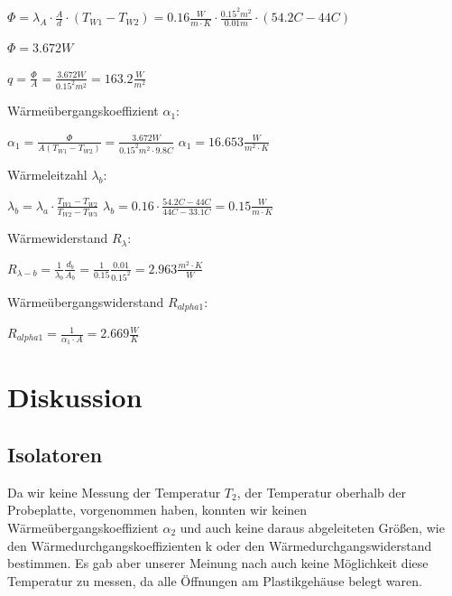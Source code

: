 \documentclass[12pt,a4paper,twopage]{article}
\begin{document}
\( \Phi = \lambda_A \cdot \frac{A}{d} \cdot (T_{W1}-T_{W2}) = 0.16 \frac{W}{m\cdot K} \cdot \frac{0.15^2 m^2}{0.01m} \cdot (54.2 C - 44 C) \)

\( \boxed{ \Phi = 3.672 W }\) 

\( q = \frac{\Phi}{A} = \frac{3.672W}{0.15^2 m^2}=  \boxed{163.2 \frac{W}{m^2}} \)

Wärmeübergangskoeffizient $\alpha_1$:

\( \alpha_1 = \frac{\Phi}{A(T_{W1}-T_{W2})} = \frac{3.672W}{0.15^2 m^2 \cdot 9.8C} \) 
\( \alpha_1 = \boxed{16.653 \frac{W}{m^{2} \cdot K} } \)

Wärmeleitzahl $\lambda_b$:

\(\lambda_b = \lambda_a \cdot \frac{T_{W1}-T_{W2}}{T_{W2}-T_{W3}} \)
\(\lambda_b = 0.16 \cdot \frac{54.2C-44C}{44C-33.1C}  = \boxed{ 0.15 \frac{W}{m\cdot K} } \)

Wärmewiderstand $R_\lambda$:

\( R_{\lambda-b} = \frac{1}{\lambda_b}\frac{d_b}{A_b} = \frac{1}{0.15}\frac{0.01}{0.15^2}= \boxed{2.963 \frac{m^2 \cdot K}{W}} \)

Wärmeübergangswiderstand $R_{alpha1}$:

\( R_{alpha1} = \frac{1}{\alpha_1 \cdot A} = \boxed{2.669 \frac{W}{K} }\)

\section{Diskussion}
								
\subsection{Isolatoren}								
Da wir keine Messung der Temperatur $T_2$, der Temperatur oberhalb der Probeplatte, vorgenommen haben, konnten wir keinen Wärmeübergangskoeffizient $\alpha_2$ und auch keine daraus abgeleiteten Größen, wie den Wärmedurchgangskoeffizienten k oder den Wärmedurchgangswiderstand bestimmen. Es gab aber unserer Meinung nach auch keine Möglichkeit diese Temperatur zu messen, da alle Öffnungen am Plastikgehäuse belegt waren.  								
\end{document}
